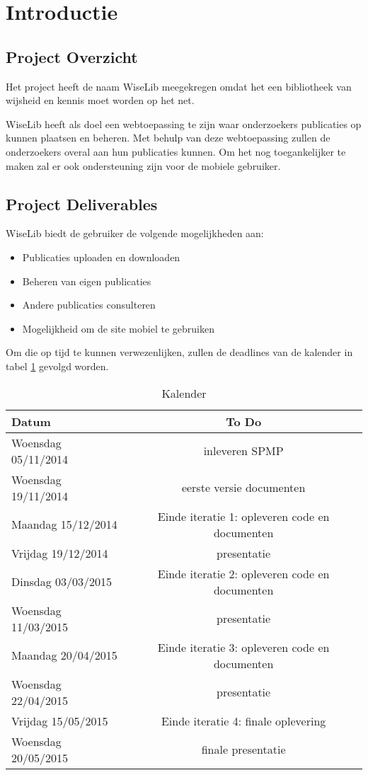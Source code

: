 \section{Introductie}

\subsection {Project Overzicht}

Het project heeft de naam WiseLib meegekregen omdat het een bibliotheek van wijsheid en kennis moet worden op het net.

WiseLib heeft als doel een webtoepassing te zijn waar onderzoekers publicaties op kunnen plaatsen en beheren. Met behulp van deze webtoepassing zullen de onderzoekers overal aan hun publicaties kunnen. Om het nog toegankelijker te maken zal er ook ondersteuning zijn voor de mobiele gebruiker.

\subsection{Project Deliverables}

WiseLib biedt de gebruiker de volgende mogelijkheden aan:

\begin{itemize}
\item Publicaties uploaden en downloaden
\item Beheren van eigen publicaties
\item Andere publicaties consulteren
\item Mogelijkheid om de site mobiel te gebruiken
\end{itemize}

Om die op tijd te kunnen verwezenlijken, zullen de deadlines van de kalender in tabel \ref{tab:kalender} gevolgd worden.

\begin{table}[h]

\begin{tabular}{|l|c|}
\hline
\textbf{Datum} & \textbf{To Do}\\
\hline
 Woensdag 05/11/2014 & inleveren SPMP \\
Woensdag 19/11/2014 & eerste versie documenten \\
Maandag 15/12/2014 & Einde iteratie 1: opleveren code en documenten \\
Vrijdag 19/12/2014 & presentatie \\
\hline \hline
Dinsdag 03/03/2015 & Einde iteratie 2: opleveren code en documenten \\
Woensdag 11/03/2015 & presentatie\\
Maandag 20/04/2015 & Einde iteratie 3: opleveren code en documenten \\
Woensdag 22/04/2015 & presentatie \\
Vrijdag 15/05/2015 & Einde iteratie 4: finale oplevering\\
Woensdag 20/05/2015 & finale presentatie\\
\hline
\end{tabular}

\caption{Kalender}
\label{tab:kalender}
\end{table}

